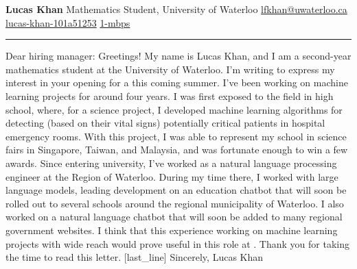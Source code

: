 \documentclass[12pt]{article}
\newcommand{\contact}[3]{{#1} \hspace{0.05em} \href{#2}{#3} \newline}
\newcommand{\companyname}{}
\newcommand{\position}{}
\begin{document}
\noindent\begin{minipage}[t]{0.3\textwidth}
  \vspace{0pt}
  \begin{flushleft}
      {\LARGE \textbf{Lucas Khan}} \newline
      {\large Mathematics Student, University of Waterloo} \newline \newline
      \contact{\faEnvelopeSquare}{mailto:lfkhan@uwaterloo.ca}{lfkhan@uwaterloo.ca}
      \contact{\faLinkedinSquare}{https://linkedin.com/in/lucas-khan-101a51253}{lucas-khan-101a51253}
      \contact{\faGithubSquare}{https://github.com/1-mbps}{1-mbps}
  \end{flushleft}
\end{minipage}%
\hspace{0.07\textwidth}%
\begin{minipage}[t]{0.63\textwidth}
  \vspace{0pt}
  \rule{\linewidth}{3px} %
  \newline \newline
  Dear hiring manager:
  \newline \newline
  Greetings! My name is Lucas Khan, and I am a second-year mathematics student at the University of Waterloo. I’m writing to express my interest in your opening for a \position this coming summer.
  \newline \newline
  I've been working on machine learning projects for around four years. I was first exposed to the field in high school, where, for a science project, I developed machine learning algorithms for detecting (based on their vital signs) potentially critical patients in hospital emergency rooms. With this project, I was able to represent my school in science fairs in Singapore, Taiwan, and Malaysia, and was fortunate enough to win a few awards.
  \newline \newline
  Since entering university, I've worked as a natural language processing engineer at the Region of Waterloo. During my time there, I worked with large language models, leading development on an education chatbot that will soon be rolled out to several schools around the regional municipality of Waterloo. I also worked on a natural language chatbot that will soon be added to many regional government websites. I think that this experience working on machine learning projects with wide reach would prove useful in this role at \companyname.
  \newline \newline
  Thank you for taking the time to read this letter. [last_line]
  \newline \newline
  Sincerely,
  \newline \newline \newline
  Lucas Khan
\end{minipage}
\end{document}

